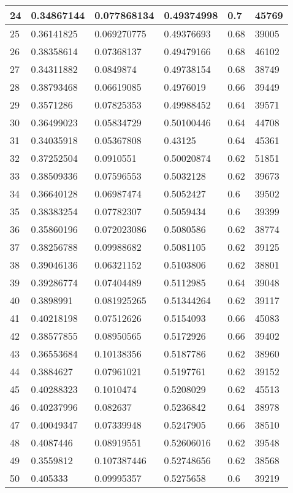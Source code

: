 \begin{longtable}{|l|l|l|l|l|l|}
24 & 0.34867144 & 0.077868134 & 0.49374998 & 0.7 & 45769 \\ \hline 
25 & 0.36141825 & 0.069270775 & 0.49376693 & 0.68 & 39005 \\ \hline 
26 & 0.38358614 & 0.07368137 & 0.49479166 & 0.68 & 46102 \\ \hline 
27 & 0.34311882 & 0.0849874 & 0.49738154 & 0.68 & 38749 \\ \hline 
28 & 0.38793468 & 0.06619085 & 0.4976019 & 0.66 & 39449 \\ \hline 
29 & 0.3571286 & 0.07825353 & 0.49988452 & 0.64 & 39571 \\ \hline 
30 & 0.36499023 & 0.05834729 & 0.50100446 & 0.64 & 44708 \\ \hline 
31 & 0.34035918 & 0.05367808 & 0.43125 & 0.64 & 45361 \\ \hline 
32 & 0.37252504 & 0.0910551 & 0.50020874 & 0.62 & 51851 \\ \hline 
33 & 0.38509336 & 0.07596553 & 0.5032128 & 0.62 & 39673 \\ \hline 
34 & 0.36640128 & 0.06987474 & 0.5052427 & 0.6 & 39502 \\ \hline 
35 & 0.38383254 & 0.07782307 & 0.5059434 & 0.6 & 39399 \\ \hline 
36 & 0.35860196 & 0.072023086 & 0.5080586 & 0.62 & 38774 \\ \hline 
37 & 0.38256788 & 0.09988682 & 0.5081105 & 0.62 & 39125 \\ \hline 
38 & 0.39046136 & 0.06321152 & 0.5103806 & 0.62 & 38801 \\ \hline 
39 & 0.39286774 & 0.07404489 & 0.5112985 & 0.64 & 39048 \\ \hline 
40 & 0.3898991 & 0.081925265 & 0.51344264 & 0.62 & 39117 \\ \hline 
41 & 0.40218198 & 0.07512626 & 0.5154093 & 0.66 & 45083 \\ \hline 
42 & 0.38577855 & 0.08950565 & 0.5172926 & 0.66 & 39402 \\ \hline 
43 & 0.36553684 & 0.10138356 & 0.5187786 & 0.62 & 38960 \\ \hline 
44 & 0.3884627 & 0.07961021 & 0.5197761 & 0.62 & 39152 \\ \hline 
45 & 0.40288323 & 0.1010474 & 0.5208029 & 0.62 & 45513 \\ \hline 
46 & 0.40237996 & 0.082637 & 0.5236842 & 0.64 & 38978 \\ \hline 
47 & 0.40049347 & 0.07339948 & 0.5247905 & 0.66 & 38510 \\ \hline 
48 & 0.4087446 & 0.08919551 & 0.52606016 & 0.62 & 39548 \\ \hline 
49 & 0.3559812 & 0.107387446 & 0.52748656 & 0.62 & 38568 \\ \hline 
50 & 0.405333 & 0.09995357 & 0.5275658 & 0.6 & 39219 \\ \hline 
\end{longtable}